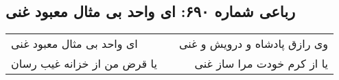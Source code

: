 \begin{center}
\section*{رباعی شماره ۶۹۰: ای واحد بی مثال معبود غنی}
\label{sec:sh690}
\begin{longtable}{l p{0.5cm} r}
ای واحد بی مثال معبود غنی
&&
وی رازق پادشاه و درویش و غنی
\\
یا قرض من از خزانه غیب رسان
&&
یا از کرم خودت مرا ساز غنی
\\
\end{longtable}
\end{center}
